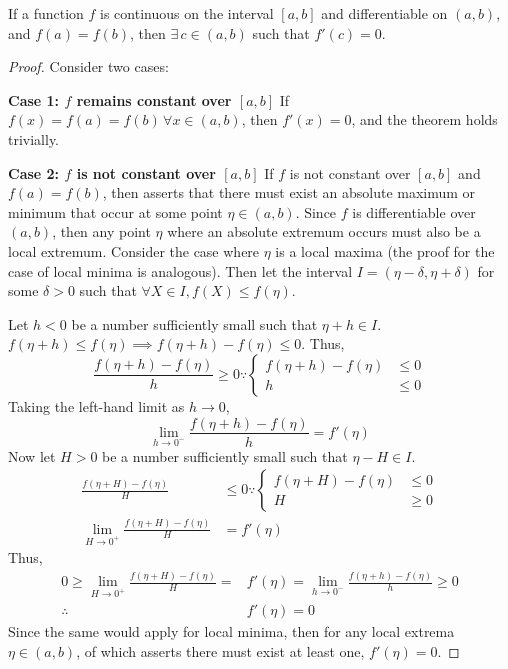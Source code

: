 \begin{lemma}\label{lemma:ROLLES}
	If a function $f$ is continuous on the interval $[a,b]$ and differentiable on $(a,b)$, and $f(a)=f(b)$, then $\exists\,c\in(a,b)$ such that $f'(c)=0$.
	\begin{proof}
		Consider two cases:
		
		\textbf{Case 1: $f$ remains constant over $[a,b]$}\newline
		If $f(x)=f(a)=f(b)\,\forall x\in(a,b)$, then $f'(x)=0$, and the theorem holds trivially. 
		
		\textbf{Case 2: $f$ is not constant over $[a,b]$}\newline
		If $f$ is not constant over $[a,b]$ and $f(a)=f(b)$, then  asserts that there must exist an absolute maximum
		or minimum that occur at some point $\eta\in(a,b)$. Since $f$ is differentiable over $(a,b)$, then any point $\eta$ where an absolute
		extremum occurs must also be a local extremum. Consider the case where $\eta$ is a local maxima (the proof for the case of local minima
		is analogous). Then let the interval $I=(\eta-\delta,\eta+\delta)$ for some $\delta>0$ such that $\forall X\in I,f(X)\leq f(\eta)$.

		Let $h<0$ be a number sufficiently small such that $\eta+h\in I$. $f(\eta+h)\leq f(\eta)\implies f(\eta+h)-f(\eta)\leq0$. Thus,
		$$
			\frac{f(\eta+h)-f(\eta)}{h}\geq0\because\left\{\begin{matrix}
				f(\eta+h)-f(\eta)&\leq0\\
				h&\leq0
			\end{matrix}\right.
		$$
		Taking the left-hand limit as $h\rightarrow0$,
		$$
			\lim_{h\rightarrow0^-}\frac{f(\eta+h)-f(\eta)}{h}=f'(\eta)
		$$
		Now let $H>0$ be a number sufficiently small such that $\eta-H\in I$.
		\begin{align*}
			\frac{f(\eta+H)-f(\eta)}{H}&\leq0\because\left\{\begin{matrix}
				f(\eta+H)-f(\eta)&\leq0\\
				H&\geq0
			\end{matrix}\right.\\
			\lim_{H\rightarrow0^+}\frac{f(\eta+H)-f(\eta)}{H}&=f'(\eta)
		\end{align*}
		Thus,
		\begin{align*}
			0\geq\lim_{H\rightarrow0^+}\frac{f(\eta+H)-f(\eta)}{H}=&f'(\eta)=\lim_{h\rightarrow0^-}\frac{f(\eta+h)-f(\eta)}{h}\geq0\\
			\therefore\,&f'(\eta)=0
		\end{align*}
		Since the same would apply for local minima, then for any local extrema $\eta\in(a,b)$, of which  asserts
		there must exist at least one, $f'(\eta)=0$.
	\end{proof}
\end{lemma}

